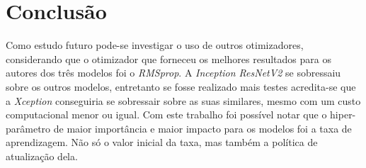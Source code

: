 \documentclass{bmvc2k}
\begin{document}

\section{Conclusão}
\label{sec:conc}
Como estudo futuro pode-se investigar o uso de outros otimizadores, considerando que o otimizador que forneceu os melhores resultados para os autores dos três modelos foi o \textit{RMSprop}. A \textit{Inception ResNetV2} se sobressaiu sobre os outros modelos, entretanto se fosse realizado mais testes acredita-se que a \textit{Xception} conseguiria se sobressair sobre as suas similares, mesmo com um custo computacional menor ou igual. Com este trabalho foi possível notar que o hiper-parâmetro de maior importância e maior impacto para os modelos foi a taxa de aprendizagem. Não só o valor inicial da taxa, mas também a política de atualização dela.
\clearpage

\end{document}
